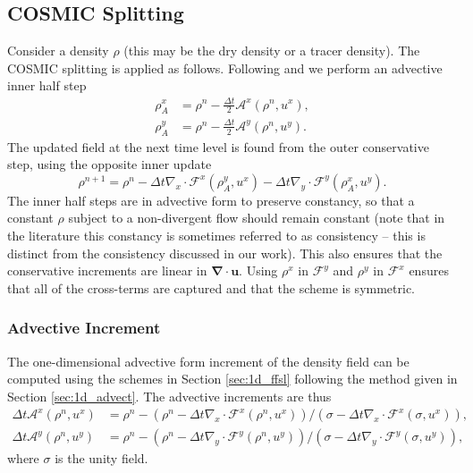 \documentclass[11pt,a4paper]{article}
\begin{document}
\subsection{COSMIC Splitting} \label{sec:cosmic_density}
Consider a density $\rho$ (this may be the dry density or a tracer density). The COSMIC splitting is applied as follows.
Following \citet{lin1996ffsl} and \citet{leonard1996cosmic} we perform an advective inner half step
\begin{subequations}
\begin{align}
    \rho_A^x &= \rho^n - \frac{\Delta{t}}{2} \mathcal{A}^x(\rho^n, u^x), \\
    \rho_A^y &= \rho^n - \frac{\Delta{t}}{2} \mathcal{A}^y(\rho^n, u^y).
\end{align}
\end{subequations}
The updated field at the next time level is found from the outer conservative step, using the opposite inner update
\begin{equation} \label{eqn:cosmic_density}
    \rho^{n+1} = \rho^{n} - \Delta{t} \nabla_x\cdot \mathcal{F}^x(\rho_A^y,u^x) - \Delta{t} \nabla_y \cdot \mathcal{F}^y(\rho_A^x,u^y).
\end{equation}
The inner half steps are in advective form to preserve constancy, so that a constant $\rho$ subject to a non-divergent flow should remain constant (note that in the literature this constancy is sometimes referred to as consistency -- this is distinct from the consistency discussed in our work). This also ensures that the conservative increments are linear in $\bm{\nabla\cdot u}$. Using $\rho^x$ in $\mathcal{F}^y$ and $\rho^y$ in $\mathcal{F}^x$ ensures that all of the cross-terms are captured \citep{kent2019crossterms} and that the scheme is symmetric. 

\subsubsection{Advective Increment} \label{sec:advective_increment}

The one-dimensional advective form increment of the density field can be computed using the schemes in Section \ref{sec:1d_ffsl} following the method given in Section \ref{sec:1d_advect}. The advective increments are thus
\begin{subequations} \label{eqn:advective_operators}
\begin{align}
    \Delta{t} \mathcal{A}^x(\rho^n, u^x) &= \rho^n - \left( \rho^n - \Delta{t} \nabla_x\cdot \mathcal{F}^x(\rho^n,u^x)\right)/\left( \sigma - \Delta{t} \nabla_x\cdot \mathcal{F}^x(\sigma,u^x)\right), \\
    \Delta{t} \mathcal{A}^y(\rho^n, u^y) &= \rho^n - \left( \rho^n - \Delta{t} \nabla_y\cdot \mathcal{F}^y(\rho^n,u^y)\right)/\left( \sigma - \Delta{t} \nabla_y\cdot \mathcal{F}^y(\sigma,u^y)\right),
\end{align}
\end{subequations}
where $\sigma$ is the unity field.
\end{document}
